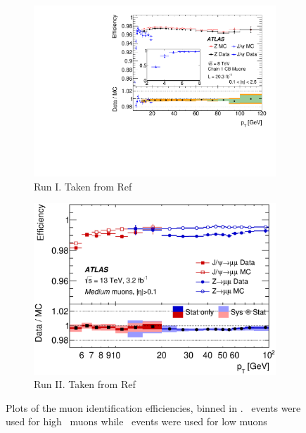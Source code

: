 \begin{figure}[h]
\begin{subfigure}{0.5\textwidth}
   \includegraphics[width=\textwidth]{figures/Full_eff_pt_jpsi_Staco_CB_noCrack.pdf}
	\caption{Run I. Taken from Ref~\cite{Aad:2014rra}}
\end{subfigure} %
\begin{subfigure}{0.5\textwidth}
   \includegraphics[width=\textwidth]{figures/fig_06.eps}
	\caption{Run II. Taken from Ref~\cite{Aad:2016jkr}}
\end{subfigure}
\caption{Plots of the muon identification efficiencies, binned in \pT. \Zmm\ events were used for high \pt\ muons 
while \Jmm\ events were used for low \pt muons  
}
\label{fig:muEff}
\end{figure}


